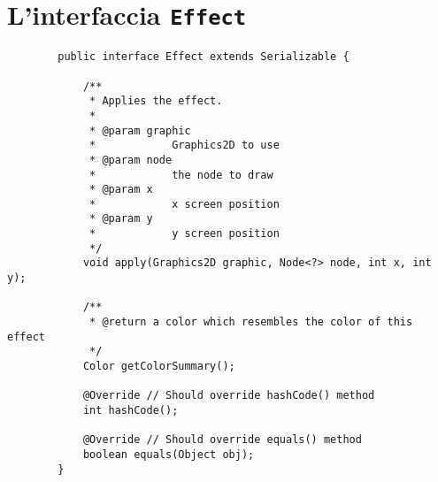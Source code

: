 

\appendix
\chapter{L'interfaccia \texttt{Effect}}\label{appendix:effect}
    \begin{verbatim}
        public interface Effect extends Serializable {

            /**
             * Applies the effect.
             *
             * @param graphic
             *            Graphics2D to use
             * @param node
             *            the node to draw
             * @param x
             *            x screen position
             * @param y
             *            y screen position
             */
            void apply(Graphics2D graphic, Node<?> node, int x, int y);

            /**
             * @return a color which resembles the color of this effect
             */
            Color getColorSummary();

            @Override // Should override hashCode() method
            int hashCode();

            @Override // Should override equals() method
            boolean equals(Object obj);
        }
    \end{verbatim}
